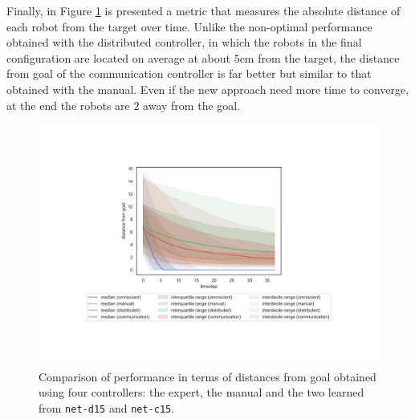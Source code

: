 Finally, in Figure \ref{fig:net-c15distance} is presented a metric that measures the 
absolute distance of each robot from the target over time.
Unlike the non-optimal performance obtained with the distributed controller, in 
which the robots in the final configuration are located on average at about 
$5$\gls{cm} from the target, the distance from goal of the communication 
controller is far better but similar to that obtained with the manual. Even if the 
new approach need more time to converge, at the end the robots are $2$ away 
from the goal.
\begin{figure}[H]
	\centering
	\includegraphics[width=.65\textwidth]{contents/images/net-c15/distances-from-goal-compressed-communication}%
	\caption[Evaluation of \texttt{net-c15} distances from goal.]{Comparison of 
		performance in terms of distances from goal obtained using four controllers: 
		the expert, the manual and the two learned from \texttt{net-d15} and 
		\texttt{net-c15}.}
	\label{fig:net-c15distance}
\end{figure}

\bigskip
